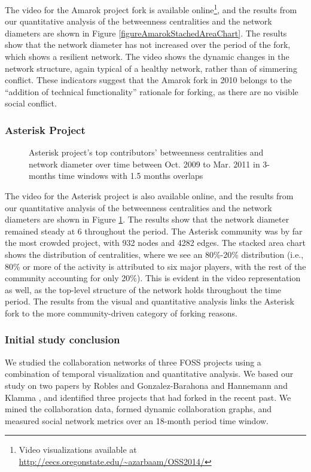 \documentclass{acm_proc_article-sp}
\begin{document}
The video for the Amarok project fork is available online\footnote{Video visualizations available at \href{http://eecs.oregonstate.edu/~azarbaam/OSS2014/}{http://eecs.oregonstate.edu/\textasciitilde azarbaam/OSS2014/}}, and the results from our quantitative analysis of the betweenness centralities and the network diameters are shown in Figure \ref{figureAmarokStachedAreaChart}. The results show that the network diameter has not increased over the period of the fork, which shows a resilient network. The video shows the dynamic changes in the network structure, again typical of a healthy network, rather than of simmering conflict. These indicators suggest that the Amarok fork in 2010 belongs to the ``addition of technical functionality'' rationale for forking, as there are no visible social conflict.

\subsubsection{Asterisk Project}
\begin{figure}[!Ht]
\centering
{}
\justifying
{}
\caption{Asterisk project's top contributors' betweenness centralities and network diameter over time between Oct. 2009 to Mar. 2011 in 3-months time windows with 1.5 months overlaps}
\label{figureAsteriskStackedAreaChart}
\end{figure}

The video for the Asterisk project is also available online, and the results from our quantitative analysis of the betweenness centralities and the network diameters are shown in Figure \ref{figureAsteriskStackedAreaChart}. The results show that the network diameter remained steady at 6 throughout the period. The Asterisk community was by far the most crowded project, with 932 nodes and 4282 edges. The stacked area chart shows the distribution of centralities, where we see an 80\%-20\% distribution (i.e., 80\% or more of the activity is attributed to six major players, with the rest of the community accounting for only 20\%). This is evident in the video representation as well, as the top-level structure of the network holds throughout the time period. The results from the visual and quantitative analysis links the Asterisk fork to the more community-driven category of forking reasons.

\subsubsection{Initial study conclusion}
We studied the collaboration networks of three FOSS projects using a combination of temporal visualization and quantitative analysis. We based our study on two papers by Robles and Gonzalez-Barahona \cite{Robles} and Hannemann and Klamma \cite{Hannemann}, and identified three projects that had forked in the recent past. We mined the collaboration data, formed dynamic collaboration graphs, and measured social network metrics over an 18-month period time window.
\end{document}

